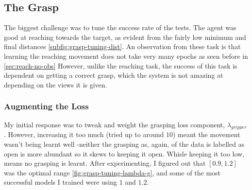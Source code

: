 \subsection{The Grasp}
The biggest challenge was to tune the success rate of the tests. The agent was good at reaching towards the target, as evident from the fairly low minimum and final distances \ref{subfig:grasp-tuning-dist}. An observation from these task is that learning the reaching movement does not take very many epochs as seen before in \ref{sec:reach-no-obs} However, unlike the reaching task, the success of this task is dependent on getting a correct grasp, which the system is not amazing at depending on the views it is given. 


\subsubsection{Augmenting the Loss}
My initial response was to tweak and weight the grasping loss component, $\lambda_{gripper}$. However, increasing it too much (tried up to around $10$) meant the movement wasn't being learnt well -neither the grasping as, again, of the data is labelled as open is more abundant so it skews to keeping it open. Whisle keeping it too low, means no grasping is learnt. After experimenting, I figured out that \(\left[0.9, 1.2\right]\) was the optimal range \ref{fig:grasp-tuning-lambda-g}, and some of the most successful models I trained were using $1$ and $1.2$.

